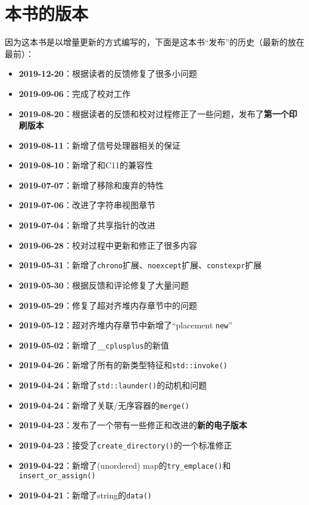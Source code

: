 \section{本书的版本}
因为这本书是以增量更新的方式编写的，下面是这本书“发布”的历史（最新的放在最前）：
\begin{itemize}
    \item \textbf{2019-12-20}：根据读者的反馈修复了很多小问题
    \item \textbf{2019-09-06}：完成了校对工作
    \item \textbf{2019-08-20}：根据读者的反馈和校对过程修正了一些问题，发布了\textbf{第一个印刷版本}
    \item \textbf{2019-08-11}：新增了信号处理器相关的保证
    \item \textbf{2019-08-10}：新增了和C11的兼容性
    \item \textbf{2019-07-07}：新增了移除和废弃的特性
    \item \textbf{2019-07-06}：改进了字符串视图章节
    \item \textbf{2019-07-04}：新增了共享指针的改进
    \item \textbf{2019-06-28}：校对过程中更新和修正了很多内容
    \item \textbf{2019-05-31}：新增了\texttt{chrono}扩展、\texttt{noexcept}扩展、\texttt{constexpr}扩展
    \item \textbf{2019-05-30}：根据反馈和评论修复了大量问题
    \item \textbf{2019-05-29}：修复了超对齐堆内存章节中的问题
    \item \textbf{2019-05-12}：超对齐堆内存章节中新增了“placement \texttt{new}”
    \item \textbf{2019-05-02}：新增了\texttt{\_\_cplusplus}的新值
    \item \textbf{2019-04-26}：新增了所有的新类型特征和\texttt{std::invoke()}
    \item \textbf{2019-04-24}：新增了\texttt{std::launder()}的动机和问题
    \item \textbf{2019-04-24}：新增了关联/无序容器的\texttt{merge()}
    \item \textbf{2019-04-23}：发布了一个带有一些修正和改进的\textbf{新的电子版本}
    \item \textbf{2019-04-23}：接受了\texttt{create\_directory()}的一个标准修正
    \item \textbf{2019-04-22}：新增了(unordered) map的\texttt{try\_emplace()}和\texttt{insert\_or\_assign()}
    \item \textbf{2019-04-21}：新增了string的\texttt{data()}

\end{itemize}
